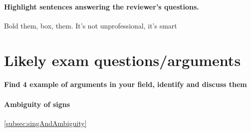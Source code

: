 \documentclass{article}
\begin{document}
\paragraph{Highlight sentences answering the reviewer's questions.} Bold them, box, them. It's not unprofessional, it's smart

\section{Likely exam questions/arguments}
\paragraph{Find 4 example of arguments in your field, identify and discuss them}
\paragraph{Ambiguity of signs} \ref{subsec:singAndAmbiguity}
\end{document}
